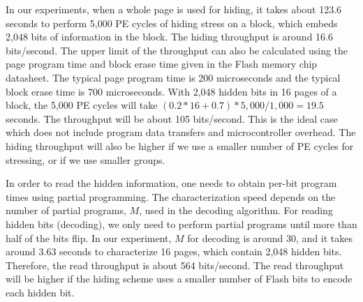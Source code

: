 In our experiments, when a whole page is used for hiding, 
it takes about 123.6 seconds to perform 5,000
PE cycles of hiding stress on a block, which embeds 2,048 bits of
information in the block. The hiding throughput is around 16.6
bits/second. The upper limit of the throughput can also be calculated using the page
program time and block erase time given in the Flash memory chip
datasheet. The typical page program time is 200 microseconds and
the typical block erase time is 700 microseconds. With 2,048 hidden bits
in 16 pages of a block, the 5,000 PE cycles will take 
$(0.2*16+0.7)*5,000/1,000=19.5$ seconds. The throughput will be about 
105 bits/second. This is the ideal case which does not include 
program data transfers and microcontroller overhead. 
The hiding throughput will also be higher if we use a smaller number of
PE cycles for stressing, or if we use smaller groups. 

In order to read the hidden information, one needs to obtain per-bit 
program times using partial programming. The characterization speed depends 
on the number of partial programs, $M$, used in the decoding algorithm. 
For reading hidden bits (decoding), we only need to perform partial programs 
until more than half of the bits flip. 
In our experiment, $M$ for decoding is around 30, 
and it takes around 3.63 seconds to characterize 16 pages, which contain 
2,048 hidden bits. Therefore, the read throughput is about 564 bits/second.  
The read throughput will be higher if the hiding scheme uses a smaller number of
Flash bits to encode each hidden bit.

